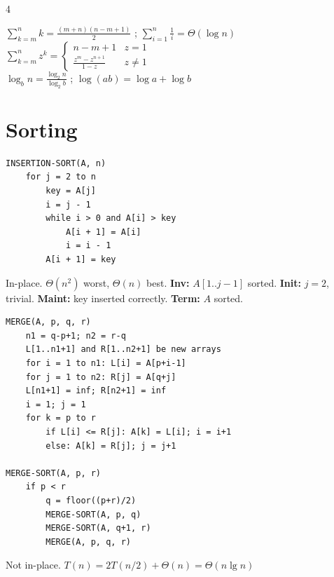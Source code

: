 \documentclass[8pt,a4paper,landscape]{extarticle}
\begin{document}
\begin{multicols*}{4}


\begin{thm}[title=Sum of a sequence]
  $\sum_{k=m}^{n} k = \frac{(m+n)(n-m+1)}{2}$ ;  $\sum_{i=1}^{n} \frac{1}{i} = \Theta(\log n)$\\
  $\sum_{k=m}^{n} z^{k} = \begin{cases} n-m+1 & z=1 \\ \frac{z^m-z^{n+1}}{1-z} & z\ne 1 \end{cases}$\\
  $\log_b n = \frac{\log_2 n}{\log_2 b}$ ; $\log(ab) = \log a + \log b$
\end{thm}

\section{Sorting}

\begin{lstlisting}
INSERTION-SORT(A, n)
    for j = 2 to n
        key = A[j]
        i = j - 1
        while i > 0 and A[i] > key
            A[i + 1] = A[i]
            i = i - 1
        A[i + 1] = key
\end{lstlisting}

\begin{prop}[title=Runtime \& Loop invariant (like induction)]
In-place. $\Theta(n^2)$ worst, $\Theta(n)$ best. \textbf{Inv:} $A[1..j{-}1]$ sorted.
\textbf{Init:} $j{=}2$, trivial. \textbf{Maint:} key inserted correctly. \textbf{Term:} $A$ sorted.
\end{prop}

\begin{lstlisting}
MERGE(A, p, q, r)
    n1 = q-p+1; n2 = r-q
    L[1..n1+1] and R[1..n2+1] be new arrays
    for i = 1 to n1: L[i] = A[p+i-1]
    for j = 1 to n2: R[j] = A[q+j]
    L[n1+1] = inf; R[n2+1] = inf
    i = 1; j = 1
    for k = p to r
        if L[i] <= R[j]: A[k] = L[i]; i = i+1
        else: A[k] = R[j]; j = j+1

MERGE-SORT(A, p, r)
    if p < r
        q = floor((p+r)/2)
        MERGE-SORT(A, p, q)
        MERGE-SORT(A, q+1, r)
        MERGE(A, p, q, r)
\end{lstlisting}

\begin{prop}[title=Runtime]
Not in-place. $T(n)=2T(n/2)+\Theta(n)=\Theta(n\lg n)$
\end{prop}


\end{multicols*}
\end{document}

